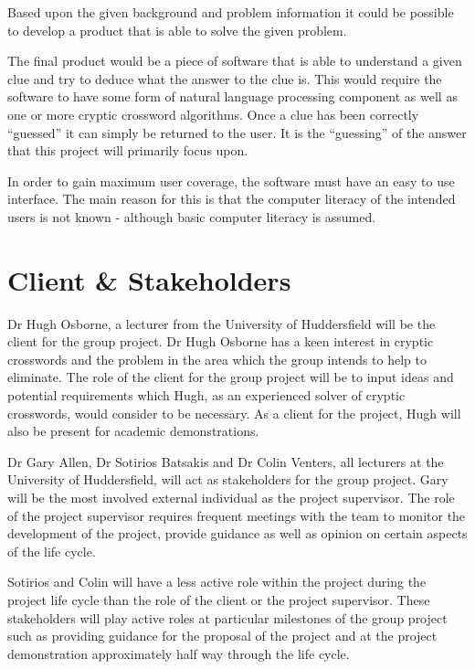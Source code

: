 Based upon the given background and problem information it could be possible to
develop a product that is able to solve the given problem.

The final product would be a piece of software that is able to understand a
given clue and try to deduce what the answer to the clue is. This would require
the software to have some form of natural language processing component as well
as one or more cryptic crossword algorithms. Once a clue has been correctly
``guessed'' it can simply be returned to the user. It is the ``guessing'' of
the answer that this project will primarily focus upon.

In order to gain maximum user coverage, the software must have an easy to use
interface. The main reason for this is that the computer literacy of the
intended users is not known - although basic computer literacy is assumed.


\section{Client \& Stakeholders}

Dr Hugh Osborne, a lecturer from the University of Huddersfield will be the
client for the group project. Dr Hugh Osborne has a keen interest in cryptic
crosswords and the problem in the area which the group intends to help to
eliminate. The role of the client for the group project will be to input ideas
and potential requirements which Hugh, as an experienced solver of cryptic 
crosswords, would consider to be necessary. As a client for the project, Hugh 
will also be present for academic demonstrations.

Dr Gary Allen, Dr Sotirios Batsakis and Dr Colin Venters, all lecturers at the
University of Huddersfield, will act as stakeholders for the group project. Gary
will be the most involved external individual as the project supervisor. The 
role of the project supervisor requires frequent meetings with the team to monitor 
the development of the project, provide guidance as well as opinion on certain 
aspects of the life cycle.

Sotirios and Colin will have a less active role within the project during the
project life cycle than the role of the client or the project supervisor.  These
stakeholders will play active roles at particular milestones of the group
project such as providing guidance for the proposal of the project and at the
project demonstration approximately half way through the life cycle.



